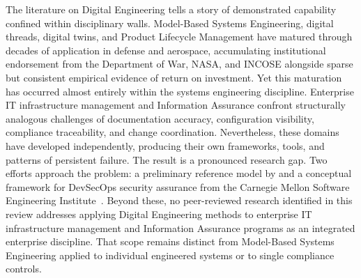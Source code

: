 \label{chap:chapter_2}



The literature on Digital Engineering tells a story of demonstrated capability confined within disciplinary walls. Model-Based Systems Engineering, digital threads, digital twins, and Product Lifecycle Management have matured through decades of application in defense and aerospace, accumulating institutional endorsement from the Department of War, NASA, and INCOSE alongside sparse but consistent empirical evidence of return on investment. Yet this maturation has occurred almost entirely within the systems engineering discipline. Enterprise IT infrastructure management and Information Assurance confront structurally analogous challenges of documentation accuracy, configuration visibility, compliance traceability, and change coordination. Nevertheless, these domains have developed independently, producing their own frameworks, tools, and patterns of persistent failure. The result is a pronounced research gap. Two efforts approach the problem: a preliminary reference model by \textcite{Bonar_Hastings_2024} and a conceptual framework for DevSecOps security assurance from the Carnegie Mellon Software Engineering Institute~\parencite{CMU_SEI_DevSecOps_2023}. Beyond these, no peer-reviewed research identified in this review addresses applying Digital Engineering methods to enterprise IT infrastructure management and Information Assurance programs as an integrated enterprise discipline. That scope remains distinct from Model-Based Systems Engineering applied to individual engineered systems or to single compliance controls.

